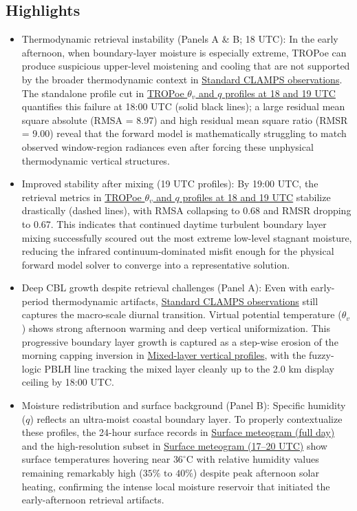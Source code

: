 \documentclass[11pt]{article}
\begin{document}
\subsection*{Highlights}
\begin{itemize}
  \item Thermodynamic retrieval instability (Panels A \& B; 18 UTC): In the early afternoon, when boundary-layer moisture is especially extreme, TROPoe can produce suspicious upper-level moistening and cooling that are not supported by the broader thermodynamic context in \hyperref[fig:deep_cbl_c1:deep_cbl_c1_instrument_template_4panel]{Standard CLAMPS observations}. The standalone profile cut in \hyperref[fig:deep_cbl_c1:deep_cbl_c1_aux_tropoe_t_q_profiles_18_19]{TROPoe $\theta_v$ and $q$ profiles at 18 and 19 UTC} quantifies this failure at 18:00 UTC (solid black lines); a large residual mean square absolute (RMSA = 8.97) and high residual mean square ratio (RMSR = 9.00) reveal that the forward model is mathematically struggling to match observed window-region radiances even after forcing these unphysical thermodynamic vertical structures.
  \item Improved stability after mixing (19 UTC profiles): By 19:00 UTC, the retrieval metrics in \hyperref[fig:deep_cbl_c1:deep_cbl_c1_aux_tropoe_t_q_profiles_18_19]{TROPoe $\theta_v$ and $q$ profiles at 18 and 19 UTC} stabilize drastically (dashed lines), with RMSA collapsing to 0.68 and RMSR dropping to 0.67. This indicates that continued daytime turbulent boundary layer mixing successfully scoured out the most extreme low-level stagnant moisture, reducing the infrared continuum-dominated misfit enough for the physical forward model solver to converge into a representative solution.
  \item Deep CBL growth despite retrieval challenges (Panel A): Even with early-period thermodynamic artifacts, \hyperref[fig:deep_cbl_c1:deep_cbl_c1_instrument_template_4panel]{Standard CLAMPS observations} still captures the macro-scale diurnal transition. Virtual potential temperature ($\theta_v$) shows strong afternoon warming and deep vertical uniformization. This progressive boundary layer growth is captured as a step-wise erosion of the morning capping inversion in \hyperref[fig:deep_cbl_c1:deep_cbl_c1_aux_mixed_layer_profiles]{Mixed-layer vertical profiles}, with the fuzzy-logic PBLH line tracking the mixed layer cleanly up to the 2.0 km display ceiling by 18:00 UTC.
  \item Moisture redistribution and surface background (Panel B): Specific humidity ($q$) reflects an ultra-moist coastal boundary layer. To properly contextualize these profiles, the 24-hour surface records in \hyperref[fig:deep_cbl_c1:deep_cbl_c1_aux_surface_meteogram]{Surface meteogram (full day)} and the high-resolution subset in \hyperref[fig:deep_cbl_c1:deep_cbl_c1_aux_surface_meteogram_17_20]{Surface meteogram (17–20 UTC)} show surface temperatures hovering near $36^\circ\text{C}$ with relative humidity values remaining remarkably high ($35\%\text{ to }40\%$) despite peak afternoon solar heating, confirming the intense local moisture reservoir that initiated the early-afternoon retrieval artifacts.

\end{itemize}
\end{document}
